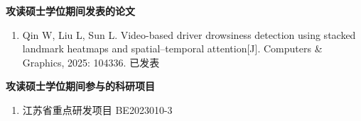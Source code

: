 
\begin{flushleft} 
  \bfseries\large 攻读硕士学位期间发表的论文\\
  \relax
\end{flushleft}

\begin{enumerate}
  \renewcommand{\labelenumi}{[\theenumi]}
  \item  Qin W, Liu L, Sun L. Video-based driver drowsiness detection using stacked landmark heatmaps and spatial–temporal attention[J]. Computers \& Graphics, 2025: 104336. 已发表
\end{enumerate}

\vspace{2em}

\begin{flushleft}
  \bfseries\large 攻读硕士学位期间参与的科研项目\\
  \relax
\end{flushleft}

\begin{enumerate}
  \renewcommand{\labelenumi}{[\theenumi]}
  \item 江苏省重点研发项目 BE2023010-3
\end{enumerate}
